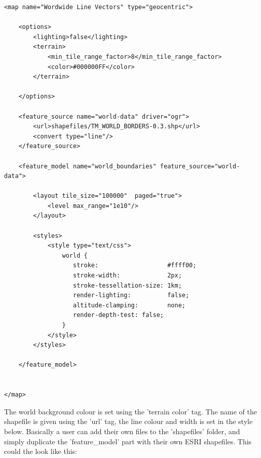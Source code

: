 \begin{lstlisting}
<map name="Wordwide Line Vectors" type="geocentric">
  
    <options>
        <lighting>false</lighting>
        <terrain>
            <min_tile_range_factor>8</min_tile_range_factor>
            <color>#000000FF</color>
        </terrain>
      
    </options>

    <feature_source name="world-data" driver="ogr">
        <url>shapefiles/TM_WORLD_BORDERS-0.3.shp</url>
        <convert type="line"/>
    </feature_source>
    
    <feature_model name="world_boundaries" feature_source="world-data">
        
        <layout tile_size="100000"  paged="true">
            <level max_range="1e10"/>
        </layout>
                
        <styles>
            <style type="text/css">
                world {
                   stroke:                   #ffff00;
                   stroke-width:             2px;
                   stroke-tessellation-size: 1km;
                   render-lighting:          false;
                   altitude-clamping:        none;
                   render-depth-test: false;
                }            
            </style>
        </styles>
        
    </feature_model>
 

</map>
\end{lstlisting}

The world background colour is set using the 'terrain color' tag. The name of the shapefile is given using the 'url' tag, the line colour and width is set in the style below. Basically a user can add their own files to the 'shapefiles' folder, and simply duplicate the 'feature\_model' part with their own ESRI shapefiles. This could the look like this:

